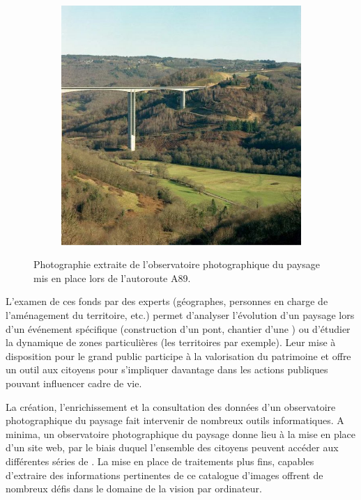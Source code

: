 \begin{figure}[h]
\begin{subfigure}[t]{0.3\textwidth}
	\end{subfigure}
	~
	 \begin{subfigure}[t]{0.3\textwidth}	
			\includegraphics[width=\textwidth]{images/intro/opp_03}
	\end{subfigure}
	\caption{Photographie extraite de l'observatoire photographique du paysage mis en place lors  de l'autoroute A89.}
	\label{fig:intro:oppex}
\end{figure}

L'examen de ces fonds par des experts (géographes, personnes en charge de l'aménagement du territoire, etc.) permet d'analyser l'évolution d'un paysage lors d'un événement spécifique (construction d'un pont, chantier d'une ) ou d'étudier la dynamique de zones particulières (les territoires  par exemple). Leur mise à disposition pour le grand public participe à la valorisation du patrimoine  et offre un outil aux citoyens pour s'impliquer davantage dans les actions publiques pouvant influencer  cadre de vie. 


La création, l'enrichissement et la consultation des données d'un observatoire photographique du paysage fait intervenir de nombreux outils informatiques. A minima, un observatoire photographique du paysage donne lieu à la mise en place d'un site web, par le biais duquel l'ensemble des citoyens peuvent accéder aux différentes séries de . La mise en place de traitements plus fins, capables d'extraire des informations pertinentes de ce catalogue d'images offrent de nombreux défis dans le domaine de la vision par ordinateur.

